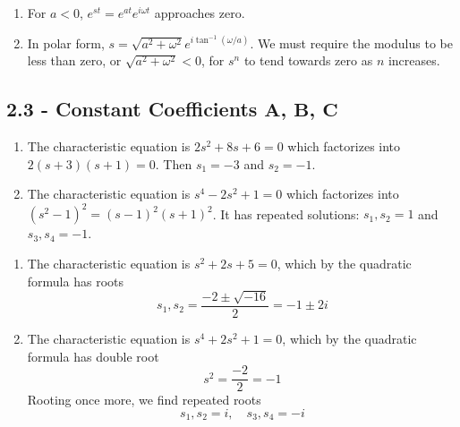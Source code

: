 \documentclass[a4paper]{article}
\begin{document}
\begin{enumerate}[label=(\alph*)]
	\item For \(a < 0\), \(e^{st} = e^{at}e^{i \omega t}\) approaches zero.
	\item In polar form, \(s = \sqrt{a^{2} + \omega^{2}} e^{i \tan^{-1}\left( \omega / a \right)}\). We must require the modulus to be less than zero, or \(\sqrt{a^{2} + \omega^{2}} < 0\), for \(s^{n}\) to tend towards zero as \(n\) increases.
\end{enumerate}

\newpage

\subsection{\textsf{2.3 - Constant Coefficients \texorpdfstring{\(\pmb{A}\), \(\pmb{B}\), \(\pmb{C}\)}{A, B, C}}}


\begin{enumerate}[label=(\alph*)]
	\item The characteristic equation is \(2s^{2} + 8s + 6 = 0\) which factorizes into \(2 \!\left( s + 3 \right) \!\left( s + 1 \right) = 0\). Then \(s_{1} = -3\) and \(s_{2} = -1\).
	\item The characteristic equation is \(s^{4} - 2s^{2} + 1 = 0\) which factorizes into \(\!\left( s^{2} - 1 \right)^{2} = \!\left( s - 1 \right)^{2}\!\left( s + 1 \right)^{2}\). It has repeated solutions: \(s_{1}, s_{2} = 1\) and \(s_{3}, s_{4} = -1\). 
\end{enumerate}


\begin{enumerate}[label=(\alph*)]
	\item The characteristic equation is \(s^{2} + 2s + 5 = 0\), which by the quadratic formula has roots
	\[
		s_{1}, s_{2} = \frac{-2 \pm \sqrt{-16}}{2} = -1 \pm 2i
	\]
	\item The characteristic equation is \(s^{4} + 2s^{2} + 1 = 0\), which by the quadratic formula has double root
	\[
		s^{2}= \frac{-2}{2} = -1
	\]
	Rooting once more, we find repeated roots
	\[
		s_{1}, s_{2} = i, \quad s_{3}, s_{4} = -i
	\]
\end{enumerate}
\end{document}
